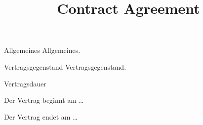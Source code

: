 \documentclass[parskip=half]{Classes/custom_contract}
\title{Contract Agreement}
\begin{document}
\maketitle
\printcontractparties


\begin{article}{Allgemeines}
    Allgemeines.
\end{article}

\begin{article}{Vertragsgegenstand}
    Vertragsgegenstand.
\end{article}

\begin{article}{Vertragsdauer}
    \begin{paragraphs}
        \item Der Vertrag beginnt am \ldots
        \item Der Vertrag endet am \ldots
    \end{paragraphs}
\end{article}

\printsignaturelines
\end{document}
